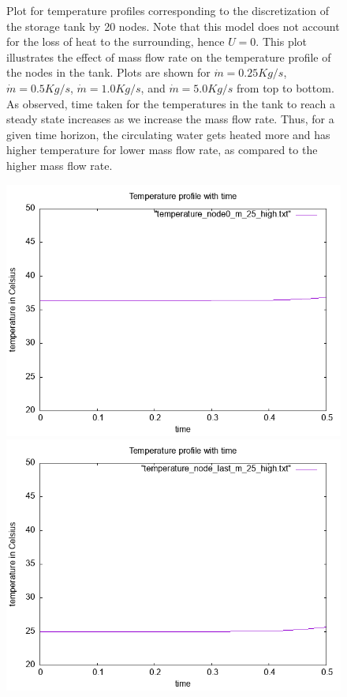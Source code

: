 \documentclass{article}
\begin{document}
\begin{figure}[ht]
\caption{Plot for temperature profiles corresponding to the discretization of the storage tank by 20 nodes. Note that this model does not account for the loss of heat to the surrounding, hence $U = 0$. This plot illustrates the effect of mass flow rate on the temperature profile of the nodes in the tank.  Plots are shown for $\dot{m} = 0.25 Kg/s$, $\dot{m} = 0.5 Kg/s$, $\dot{m} = 1.0 Kg/s$, and $\dot{m} = 5.0 Kg/s$ from top to bottom. As observed, time taken for the temperatures in the tank to reach a steady state increases as we increase the mass flow rate.  Thus, for a given time horizon, the circulating water gets heated more and has higher temperature for lower mass flow rate, as compared to the higher mass flow rate. }
\end{figure}

\begin{figure}[ht]
\centering
\includegraphics[scale =0.4]{figures/temperature_node0_N_20_m_25.png}
\includegraphics[scale =0.4]{figures/temperature_node_last_N_20_m_25.png}

\end{figure}
\end{document}
